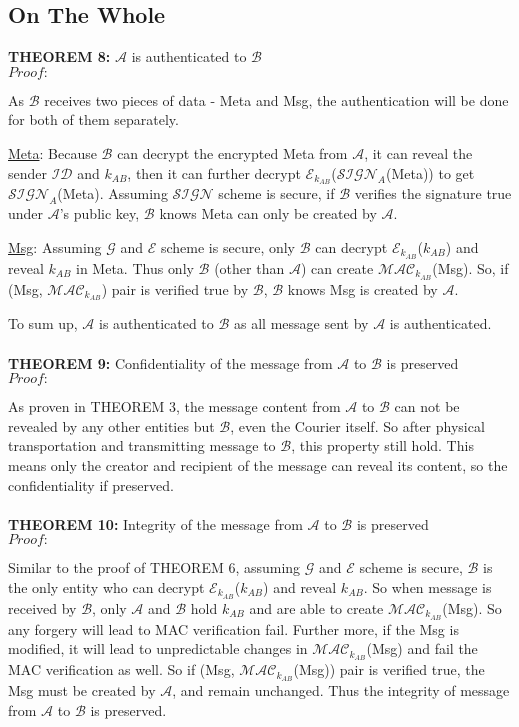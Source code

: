 \subsection{On The Whole}
\textbf{THEOREM 8:} $\mathcal{A}$ is authenticated to $\mathcal{B}$ \\
\emph{$Proof:$} \par
As $\mathcal{B}$ receives two pieces of data - Meta and Msg, the authentication will be done for both of them separately.\par
\underline{Meta}: Because $\mathcal{B}$ can decrypt the encrypted Meta from $\mathcal{A}$, it can reveal the sender $\mathcal{ID}$ and $k_{AB}$, then it can further decrypt $\mathcal{E}_{k_{AB}}$($\mathcal{SIGN}_A$(Meta)) to get $\mathcal{SIGN}_A$(Meta). Assuming $\mathcal{SIGN}$ scheme is secure, if $\mathcal{B}$ verifies the signature true under $\mathcal{A}$'s public key, $\mathcal{B}$ knows Meta can only be created by $\mathcal{A}$. \par
\underline{Msg}: Assuming $\mathcal{G}$ and $\mathcal{E}$ scheme is secure, only $\mathcal{B}$ can decrypt $\mathcal{E}_{k_{AB}}$($k_{AB}$) and reveal $k_{AB}$ in Meta. Thus only $\mathcal{B}$ (other than $\mathcal{A}$) can create $\mathcal{MAC}_{k_{AB}}$(Msg). So, if (Msg, $\mathcal{MAC}_{k_{AB}}$) pair is verified true by $\mathcal{B}$, $\mathcal{B}$ knows Msg is created by $\mathcal{A}$. \par
To sum up, $\mathcal{A}$ is authenticated to $\mathcal{B}$ as all message sent by $\mathcal{A}$ is authenticated.
\\
\\
\textbf{THEOREM 9:} Confidentiality of the message from $\mathcal{A}$ to $\mathcal{B}$ is preserved\\
\emph{$Proof:$} \par
As proven in THEOREM 3, the message content from $\mathcal{A}$ to $\mathcal{B}$ can not be revealed by any other entities but $\mathcal{B}$, even the Courier itself. So after physical transportation and transmitting message to $\mathcal{B}$, this property still hold. This means only the creator and recipient of the message can reveal its content, so the confidentiality if preserved.
\\
\\
\textbf{THEOREM 10:} Integrity of the message from $\mathcal{A}$ to $\mathcal{B}$ is preserved\\
\emph{$Proof:$} \par
Similar to the proof of THEOREM 6, assuming $\mathcal{G}$ and $\mathcal{E}$ scheme is secure, $\mathcal{B}$ is the only entity who can decrypt $\mathcal{E}_{k_{AB}}$($k_{AB}$) and reveal $k_{AB}$. So when message is received by $\mathcal{B}$, only $\mathcal{A}$ and $\mathcal{B}$ hold $k_{AB}$ and are able to create $\mathcal{MAC}_{k_{AB}}$(Msg). So any forgery will lead to MAC verification fail. Further more, if the Msg is modified, it will lead to unpredictable changes in $\mathcal{MAC}_{k_{AB}}$(Msg) and fail the MAC verification as well. So if (Msg, $\mathcal{MAC}_{k_{AB}}$(Msg)) pair is verified true, the Msg must be created by $\mathcal{A}$, and remain unchanged. Thus the integrity of message from $\mathcal{A}$ to $\mathcal{B}$ is preserved.
